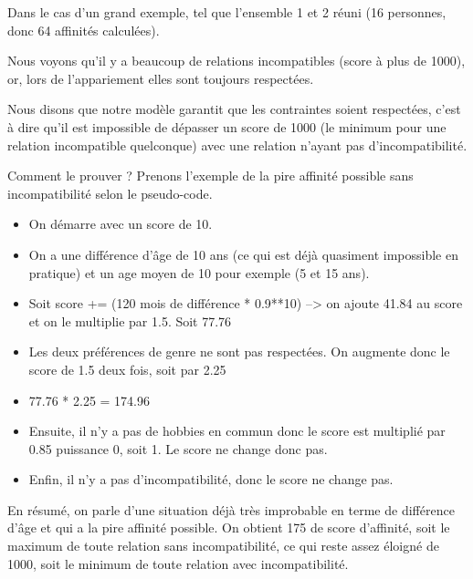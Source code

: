 \documentclass{mytex}
\begin{document}
Dans le cas d'un grand exemple, tel que l'ensemble 1 et 2 réuni (16 personnes, donc 64 affinités calculées).



Nous voyons qu'il y a beaucoup de relations incompatibles (score à plus de 1000), or, lors de l'appariement elles sont toujours respectées.


Nous disons que notre modèle garantit que les contraintes soient respectées, c'est à dire qu'il est impossible de dépasser un score de 1000 (le minimum pour une relation incompatible quelconque) avec une relation n'ayant pas d'incompatibilité. 


Comment le prouver ? Prenons l'exemple de la pire affinité possible sans incompatibilité selon le pseudo-code.

\begin{itemize}
    \item On démarre avec un score de 10.
    \item On a une différence d'âge de 10 ans (ce qui est déjà quasiment impossible en pratique) et un age moyen de 10 pour exemple (5 et 15 ans).
    \item Soit score += (120 mois de différence * 0.9**10) --> on ajoute 41.84 au score et on le multiplie par 1.5. Soit 77.76
    \item Les deux préférences de genre ne sont pas respectées. On augmente donc le score de 1.5 deux fois, soit par 2.25
    \item 77.76 * 2.25 = 174.96
    \item Ensuite, il n'y a pas de hobbies en commun donc le score est multiplié par 0.85 puissance 0, soit 1. Le score ne change donc pas.
    \item Enfin, il n'y a pas d'incompatibilité, donc le score ne change pas.
\end{itemize}

En résumé, on parle d'une situation déjà très improbable en terme de différence d'âge et qui a la pire affinité possible. On obtient 175 de score d'affinité, soit le maximum de toute relation sans incompatibilité,  ce qui reste assez éloigné de 1000, soit le minimum de toute relation avec incompatibilité.
\end{document}
